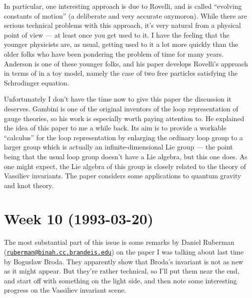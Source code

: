 \documentclass{article}
\def\tightlist{}
\renewcommand{\texttt}[1]{%
  \begingroup
  \ttfamily
  \begingroup\lccode`~=`/\lowercase{\endgroup\def~}{/\discretionary{}{}{}}%
  \begingroup\lccode`~=`[\lowercase{\endgroup\def~}{[\discretionary{}{}{}}%
  \begingroup\lccode`~=`.\lowercase{\endgroup\def~}{.\discretionary{}{}{}}%
  \catcode`/=\active\catcode`[=\active\catcode`.=\active
  \scantokens{#1\noexpand}%
  \endgroup
}
\begin{document}
In particular, one interesting approach is due to Rovelli, and is called
``evolving constants of motion'' (a deliberate and very accurate
oxymoron). While there are serious technical problems with this
approach, it's very natural from a physical point of view --- at least
once you get used to it. I have the feeling that the younger physicists
are, as usual, getting used to it a lot more quickly than the older
folks who have been pondering the problem of time for many years.
Anderson is one of these younger folks, and his paper develops Rovelli's
approach in terms of in a toy model, namely the case of two free
particles satisfying the Schrodinger equation.


Unfortunately I don't have the time now to give this paper the
discussion it deserves. Gambini is one of the original inventors of the
loop representation of gauge theories, so his work is especially worth
paying attention to. He explained the idea of this paper to me a while
back. Its aim is to provide a workable ``calculus'' for the loop
representation by enlarging the ordinary loop group to a larger group
which is actually an infinite-dimensional Lie group --- the point being
that the usual loop group doesn't have a Lie algebra, but this one does.
As one might expect, the Lie algebra of this group is closely related to
the theory of Vassiliev invariants. The paper considers some
applications to quantum gravity and knot theory.
\hypertarget{week10}{%
\section{Week 10 (1993-03-20)}\label{week10}}

The most substantial part of this issue is some remarks by Daniel
Ruberman
(\href{mailto:ruberman@binah.cc.brandeis.edu}{\nolinkurl{ruberman@binah.cc.brandeis.edu}})
on the paper I was talking about last time by Boguslaw Broda. They
apparently show that Broda's invariant is not as new as it might appear.
But they're rather technical, so I'll put them near the end, and start
off with something on the light side, and then note some interesting
progress on the Vassiliev invariant scene.
\end{document}
